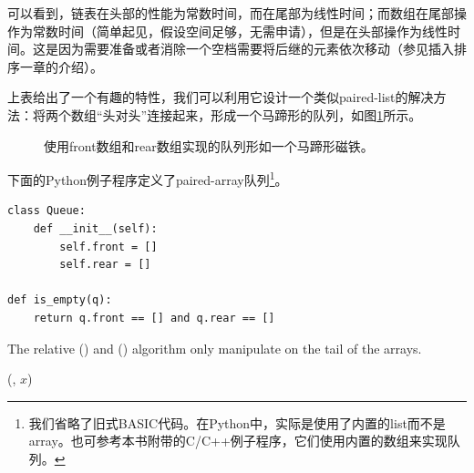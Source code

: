 \documentclass[UTF8]{article}
\begin{document}
可以看到，链表在头部的性能为常数时间，而在尾部为线性时间；而数组在尾部操作为常数时间（简单起见，假设空间足够，无需申请），但是在头部操作为线性时间。这是因为需要准备或者消除一个空档需要将后继的元素依次移动（参见插入排序一章的介绍）。

上表给出了一个有趣的特性，我们可以利用它设计一个类似paired-list的解决方法：将两个数组“头对头”连接起来，形成一个马蹄形的队列，如图\ref{fig:horseshoe-array}所示。

\begin{figure}[htbp]
  \centering
  \caption{使用front数组和rear数组实现的队列形如一个马蹄形磁铁。} \label{fig:horseshoe-array}
\end{figure}

下面的Python例子程序定义了paired-array队列\footnote{我们省略了旧式BASIC代码。在Python中，实际是使用了内置的list而不是array。也可参考本书附带的C/C++例子程序，它们使用内置的数组来实现队列。}。

\lstset{language=Python}
\begin{lstlisting}
class Queue:
    def __init__(self):
        self.front = []
        self.rear = []

def is_empty(q):
    return q.front == [] and q.rear == []
\end{lstlisting}

The relative () and () algorithm only manipulate
on the tail of the arrays.

\begin{algorithmic}
  \State {}(, $x$)
\EndFunction
\end{algorithmic}
\end{document}
